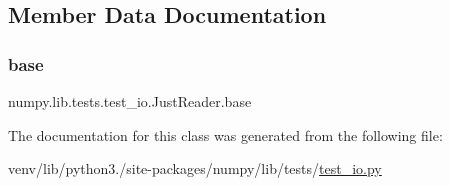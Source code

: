 \subsection{Member Data Documentation}
\mbox{\label{classnumpy_1_1lib_1_1tests_1_1test__io_1_1JustReader_a3d7674c3c55f373d69d2fa0ce729b516}} 
\subsubsection{\texorpdfstring{base}{base}}
{\footnotesize\ttfamily numpy.\+lib.\+tests.\+test\+\_\+io.\+Just\+Reader.\+base}



The documentation for this class was generated from the following file\+:\begin{DoxyCompactItemize}
\item 
venv/lib/python3./site-\/packages/numpy/lib/tests/\hyperlink{test__io_8py}{test\+\_\+io.\+py}\end{DoxyCompactItemize}
